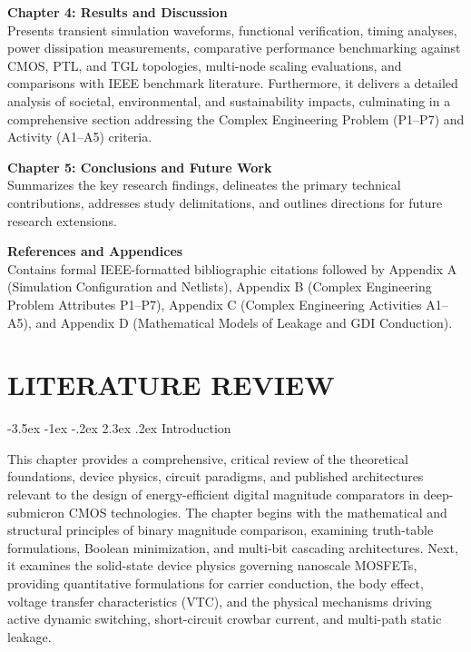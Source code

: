\documentclass[12pt,a4paper,oneside]{report}
\makeatletter
\renewcommand\section{\@startsection {section}{1}{\z@}%
                                   {-3.5ex \@plus -1ex \@minus -.2ex}%
                                   {2.3ex \@plus.2ex}%
                                   {\normalfont\normalsize\bfseries}}
\makeatother
\begin{document}
\noindent\textbf{Chapter 4: Results and Discussion}\\
Presents transient simulation waveforms, functional verification, timing analyses, power dissipation measurements, comparative performance benchmarking against CMOS, PTL, and TGL topologies, multi-node scaling evaluations, and comparisons with IEEE benchmark literature. Furthermore, it delivers a detailed analysis of societal, environmental, and sustainability impacts, culminating in a comprehensive section addressing the Complex Engineering Problem (P1--P7) and Activity (A1--A5) criteria.

\noindent\textbf{Chapter 5: Conclusions and Future Work}\\
Summarizes the key research findings, delineates the primary technical contributions, addresses study delimitations, and outlines directions for future research extensions.

\noindent\textbf{References and Appendices}\\
Contains formal IEEE-formatted bibliographic citations followed by Appendix A (Simulation Configuration and Netlists), Appendix B (Complex Engineering Problem Attributes P1--P7), Appendix C (Complex Engineering Activities A1--A5), and Appendix D (Mathematical Models of Leakage and GDI Conduction).


\chapter{LITERATURE REVIEW}

\section{Introduction}

This chapter provides a comprehensive, critical review of the theoretical foundations, device physics, circuit paradigms, and published architectures relevant to the design of energy-efficient digital magnitude comparators in deep-submicron CMOS technologies. The chapter begins with the mathematical and structural principles of binary magnitude comparison, examining truth-table formulations, Boolean minimization, and multi-bit cascading architectures. Next, it examines the solid-state device physics governing nanoscale MOSFETs, providing quantitative formulations for carrier conduction, the body effect, voltage transfer characteristics (VTC), and the physical mechanisms driving active dynamic switching, short-circuit crowbar current, and multi-path static leakage.
\end{document}
